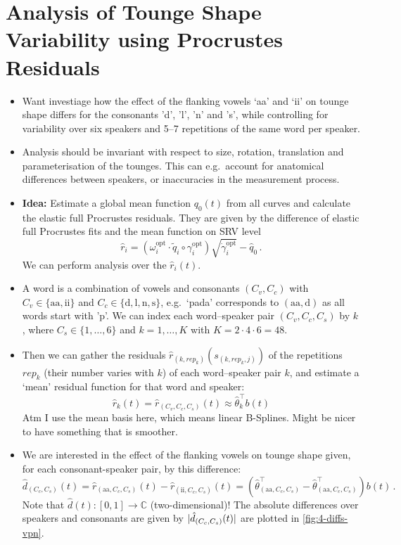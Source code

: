 \section{Analysis of Tounge Shape Variability using Procrustes Residuals}
\begin{itemize}
  \item Want investiage how the effect of the flanking vowels \enquote*{aa} and \enquote*{ii} on tounge shape differs for the consonants 'd', 'l', 'n' and 's', while controlling for variability over six speakers and 5--7 repetitions of the same word per speaker.
  \item Analysis should be invariant with respect to size, rotation, translation and parameterisation of the tounges.
    This can e.g.\ account for anatomical differences between speakers, or inaccuracies in the measurement process.
  \item \textbf{Idea:} Estimate a global mean function $q_0(t)$ from all curves and calculate the elastic full Procrustes residuals.
    They are given by the difference of elastic full Procrustes fits and the mean function on SRV level
    $$ \hat r_i = \left( \omega_i^\mathrm{opt} \cdot \widetilde q_i \circ \gamma_i^\mathrm{opt} \right) \sqrt{\dot\gamma_i^\mathrm{opt}} - \hat q_0 \,.$$
    We can perform analysis over the $\hat r_i(t)$. 
  \item A word is a combination of vowels and consonants $(C_v, C_c)$ with $C_v \in \{\mathrm{aa}, \mathrm{ii}\}$ and $C_c \in \{\mathrm{d},\mathrm{l},\mathrm{n},\mathrm{s}\}$, e.g.\ \enquote*{pada} corresponds to $(\mathrm{aa},\mathrm{d})$ as all words start with 'p'.
    We can index each word--speaker pair $\left( C_v, C_c, C_s \right)$ by $k$, where $C_s \in \{1,\dots,6\}$ and $k = 1, \dots, K$ with $K = 2 \cdot 4 \cdot 6 = 48$.
  \item Then we can gather the residuals $\hat r_{(k, rep_k)}(s_{(k,rep_k,j)})$ of the repetitions $rep_k$ (their number varies with $k$) of each word--speaker pair $k$, and estimate a \enquote*{mean} residual function for that word and speaker:
    $$ \hat r_k (t) = \hat r_{\left( C_v, C_c, C_s \right)} (t) \approx \hat \theta_k^\top b(t)$$
    Atm I use the mean basis here, which means linear B-Splines. Might be nicer to have something that is smoother.
  \item We are interested in the effect of the flanking vowels on tounge shape given, for each consonant-speaker pair, by this difference:
    $$ \hat d_{(C_c, C_s)}(t) = \hat r_{(\mathrm{aa}, C_c, C_s)} (t) - \hat r_{(\mathrm{ii}, C_c, C_s)} (t) = 
      \left( \hat\theta^\top_{(\mathrm{aa}, C_c, C_s)} - \hat\theta^\top_{(\mathrm{aa}, C_c, C_s)} \right) b(t)\,. $$
    Note that $\hat d(t) : [0,1] \rightarrow \mathbb{C}$ (two-dimensional)! The absolute differences over speakers and consonants are given by $\lvert\hat d_{(C_c, C_s)}(t)\rvert$ are plotted in \cref{fig:4-diffs-vpn}.
\end{itemize}
